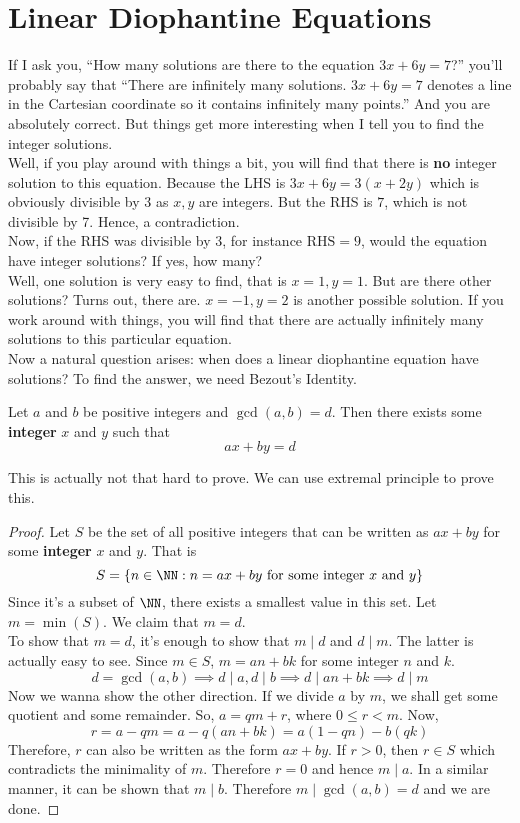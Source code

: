 \documentclass[11pt]{scrartcl}
\begin{document}
\section{Linear Diophantine Equations}
If I ask you, ``How many solutions are there to the equation \(3x+6y=7\)?'' you'll probably say that ``There are infinitely many solutions. \(3x+6y=7\) denotes a line in the Cartesian coordinate so it contains infinitely many points.'' And you are absolutely correct. But things get more interesting when I tell you to find the integer solutions.\\
Well, if you play around with things a bit, you will find that there is \textbf{no} integer solution to this equation. Because the LHS is \(3x+6y = 3(x+2y)\) which is obviously divisible by \(3\) as \(x,y\) are integers. But the RHS is \(7\), which is not divisible by 7. Hence, a contradiction. \\
Now, if the RHS was divisible by \(3\), for instance \(\text{RHS} = 9\), would the equation have integer solutions? If yes, how many? \\
Well, one solution is very easy to find, that is \(x=1, y=1\). But are there other solutions? Turns out, there are. \(x=-1, y=2\) is another possible solution. If you work around with things, you will find that there are actually infinitely many solutions to this particular equation. \\ 
Now a natural question arises: when does a linear diophantine equation have solutions? To find the answer, we need Bezout's Identity.
\begin{theorem}
Let \(a\) and \(b\) be positive integers and \(\gcd(a,b)=d\). Then there exists some \textbf{integer} \(x\) and \(y\) such that
\[ax+by = d\]
\end{theorem}
This is actually not that hard to prove. We can use extremal principle to prove this.
\begin{proof}
Let \(S\) be the set of all positive integers that can be written as \(ax+by\) for some \textbf{integer} \(x\) and \(y\). That is
\[S = \left\{ n\in \NN : n = ax+by \text{ for some integer } x \text{ and } y \right\} \]
Since it's a subset of \(\NN\), there exists a smallest value in this set. Let \(m = \min(S)\). We claim that \(m = d\). \\
To show that \(m=d\), it's enough to show that \( m \mid d\) and \(d \mid m\). The latter is actually easy to see. Since \(m \in S\), \(m = an + bk\) for some integer \(n\) and \(k\).
\[d = \gcd(a,b) \implies d \mid a, d \mid b \implies d\mid an + bk \implies d \mid m\]
Now we wanna show the other direction. If we divide \(a\) by \(m\), we shall get some quotient and some remainder. So, \(a = qm + r\), where \(0 \leq r < m\). Now,
\[ r = a - qm = a - q (an + bk) = a (1-qn) - b(qk)\]
Therefore, \(r\) can also be written as the form \(ax+by\). If \(r>0\), then \(r \in S\) which contradicts the minimality of \(m\). Therefore \(r=0\) and hence \(m \mid a\). In a similar manner, it can be shown that \(m \mid b\). Therefore \(m \mid \gcd(a,b)=d\) and we are done.
\end{proof}
\end{document}
